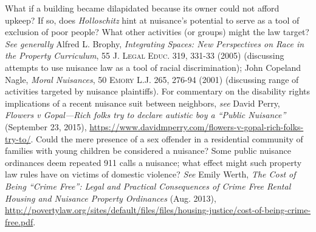 \item What if a building became dilapidated because its owner could not afford
upkeep? If so, does \textit{Holloschitz} hint at nuisance's potential to serve
as a tool of exclusion of poor people? What other activities (or groups) might
the law target? \textit{See generally} Alfred L. Brophy, \emph{Integrating
Spaces: New Perspectives on Race in the Property Curriculum}, 55 \textsc{J.
Legal Educ}. 319, 331-33 (2005) (discussing attempts to use nuisance law as a
tool of racial discrimination); John Copeland Nagle, \emph{Moral Nuisances}, 50
\textsc{Emory} L.J. 265, 276-94 (2001) (discussing range of activities targeted
by nuisance
plaintiffs). For commentary on the disability rights implications of a recent
nuisance suit between neighbors, \textit{see} David Perry, \textit{Flowers v
Gopal---Rich folks try to declare autistic boy a ``Public Nuisance''}
(September 23, 2015),
\url{https://www.davidmperry.com/flowers-v-gopal-rich-folks-try-to/}.
Could
the mere presence of a sex offender in a residential community of families with
young children be considered a nuisance? Some public nuisance ordinances deem
repeated 911 calls a nuisance; what effect might such property law rules have on
victims of domestic violence? \textit{See} Emily Werth, \textit{The
Cost of Being ``Crime Free'': Legal and Practical Consequences of Crime Free
Rental Housing and Nuisance Property Ordinances} (Aug. 2013),
\url{http://povertylaw.org/sites/default/files/files/housing-justice/cost-of-being-crime-free.pdf}.

